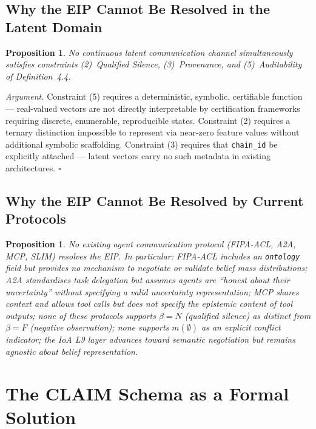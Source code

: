 \documentclass[11pt,a4paper]{article}
\theoremstyle{plain}
\newtheorem{proposition}[theorem]{Proposition}
\theoremstyle{definition}
\theoremstyle{remark}
\begin{document}
\subsection{Why the EIP Cannot Be Resolved in the Latent Domain}

\begin{proposition}
No continuous latent communication channel simultaneously satisfies constraints
(2)~Qualified Silence, (3)~Provenance, and (5)~Auditability of Definition~4.4.
\end{proposition}

\textit{Argument.} Constraint (5) requires a deterministic, symbolic, certifiable
function --- real-valued vectors are not directly interpretable by certification
frameworks requiring discrete, enumerable, reproducible states. Constraint (2)
requires a ternary distinction impossible to represent via near-zero feature values
without additional symbolic scaffolding. Constraint (3) requires that
\texttt{chain\_id} be explicitly attached --- latent vectors carry no such metadata
in existing architectures. $\square$

\subsection{Why the EIP Cannot Be Resolved by Current Protocols}

\begin{proposition}
No existing agent communication protocol (FIPA-ACL, A2A, MCP, SLIM) resolves the
EIP. In particular: FIPA-ACL includes an \texttt{ontology} field but provides no
mechanism to negotiate or validate belief mass distributions; A2A standardises task
delegation but assumes agents are ``honest about their uncertainty'' without
specifying a valid uncertainty representation; MCP shares context and allows tool
calls but does not specify the epistemic content of tool outputs; none of these
protocols supports $\beta = N$ (qualified silence) as distinct from $\beta = F$
(negative observation); none supports $m(\emptyset)$ as an explicit conflict
indicator; the IoA L9 layer \cite{ioa2025} advances toward semantic negotiation but
remains agnostic about belief representation.
\end{proposition}

\section{The CLAIM Schema as a Formal Solution}
\end{document}

